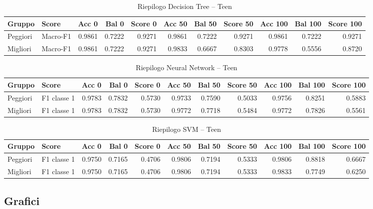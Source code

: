 \documentclass[a4paper,11pt]{article}
\begin{document}
\begin{table}[H]
\centering
\scriptsize
\caption{Riepilogo Decision Tree -- Teen}
\begin{tabular}{llrrrrrrrrr}
\toprule
Gruppo & Score & Acc 0 & Bal 0 & Score 0 & Acc 50 & Bal 50 & Score 50 & Acc 100 & Bal 100 & Score 100 \\
\midrule
Peggiori & Macro-F1 & 0.9861 & 0.7222 & 0.9271 & 0.9861 & 0.7222 & 0.9271 & 0.9861 & 0.7222 & 0.9271 \\
Migliori & Macro-F1 & 0.9861 & 0.7222 & 0.9271 & 0.9833 & 0.6667 & 0.8303 & 0.9778 & 0.5556 & 0.8720 \\
\bottomrule
\end{tabular}
\end{table}

\begin{table}[H]
\centering
\scriptsize
\caption{Riepilogo Neural Network -- Teen}
\begin{tabular}{llrrrrrrrrr}
\toprule
Gruppo & Score & Acc 0 & Bal 0 & Score 0 & Acc 50 & Bal 50 & Score 50 & Acc 100 & Bal 100 & Score 100 \\
\midrule
Peggiori & F1 classe 1 & 0.9783 & 0.7832 & 0.5730 & 0.9733 & 0.7590 & 0.5033 & 0.9756 & 0.8251 & 0.5883 \\
Migliori & F1 classe 1 & 0.9783 & 0.7832 & 0.5730 & 0.9772 & 0.7718 & 0.5484 & 0.9772 & 0.7826 & 0.5561 \\
\bottomrule
\end{tabular}
\end{table}

\begin{table}[H]
\centering
\scriptsize
\caption{Riepilogo SVM -- Teen}
\begin{tabular}{llrrrrrrrrr}
\toprule
Gruppo & Score & Acc 0 & Bal 0 & Score 0 & Acc 50 & Bal 50 & Score 50 & Acc 100 & Bal 100 & Score 100 \\
\midrule
Peggiori & F1 classe 1 & 0.9750 & 0.7165 & 0.4706 & 0.9806 & 0.7194 & 0.5333 & 0.9806 & 0.8818 & 0.6667 \\
Migliori & F1 classe 1 & 0.9750 & 0.7165 & 0.4706 & 0.9806 & 0.7194 & 0.5333 & 0.9833 & 0.7749 & 0.6250 \\
\bottomrule
\end{tabular}
\end{table}

\subsection{Grafici}
\end{document}

